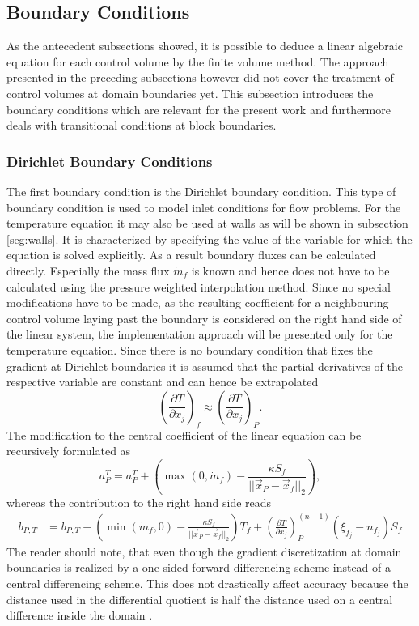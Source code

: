 \subsection{Boundary Conditions}
\label{sec:segboundary}

As the antecedent subsections showed, it is possible to deduce a linear algebraic equation for each control volume by the finite volume method. The approach presented in the preceding subsections however did not cover the treatment of control volumes at domain boundaries yet. This subsection introduces the boundary conditions which are relevant for the present work and furthermore deals with transitional conditions at block boundaries.

\subsubsection{Dirichlet Boundary Conditions}

The first boundary condition is the Dirichlet boundary condition. This type of boundary condition is used to model inlet conditions for flow problems. For the temperature equation it may also be used at walls as will be shown in subsection \ref{seg:walls}. It is characterized by specifying the value of the variable for which the equation is solved explicitly. As a result boundary fluxes can be calculated directly. Especially the mass flux \(\dot{m}_f\) is known and hence does not have to be calculated using the pressure weighted interpolation method. Since no special modifications have to be made, as the resulting coefficient for a neighbouring control volume laying past the boundary is considered on the right hand side of the linear system, the implementation approach will be presented only for the temperature equation. Since there is no boundary condition that fixes the gradient at Dirichlet boundaries it is assumed that the partial derivatives of the respective variable are constant and can hence be extrapolated
\begin{displaymath}
  \left( \frac{\partial T}{\partial x_j} \right)_f \approx \left( \frac{\partial T}{\partial x_j} \right)_P.
\end{displaymath}
The modification to the central coefficient of the linear equation can be recursively formulated as
\begin{displaymath}
  a_P^{T} = a_P^{T} + \left( \max(0,\dot{m}_f )  - \frac{\kappa S_f}{|| \vec{x}_P - \vec{x}_f ||_2} \right),
\end{displaymath}
whereas the contribution to the right hand side reads
\begin{align}
  b_{P,T} &= b_{P,T} - \left( \min(\dot{m}_f,0) - \frac{\kappa S_f}{||\vec{x}_P - \vec{x}_f||_2}\right) T_f +
  \left( \frac{\partial T}{\partial x_j}\right)_P^{(n-1)} \left(\xi_{f_j} - n_{f_j}\right)S_f \nonumber 
\end{align}
The reader should note, that even though the gradient discretization at domain boundaries is realized by a one sided forward differencing scheme instead of a central differencing scheme. This does not drastically affect accuracy because the distance used in the differential quotient is half the distance used on a central difference inside the domain \cite{schaefer99}.

